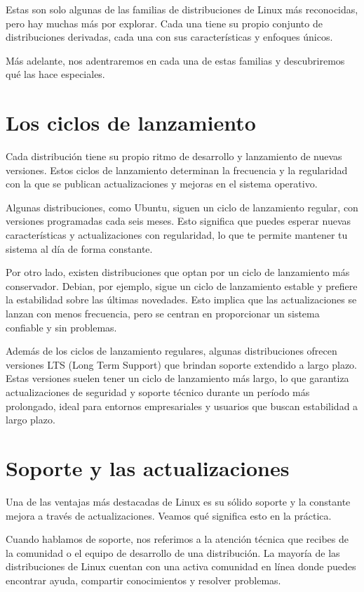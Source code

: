 \documentclass[
  jou,
  floatsintext,
  longtable,
  a4paper,
  nolmodern,
  notxfonts,
  notimes,
  12pt,
  colorlinks=true,linkcolor=blue,citecolor=blue,urlcolor=blue]{apa7}
\begin{document}
Estas son solo algunas de las familias de distribuciones de Linux más
reconocidas, pero hay muchas más por explorar. Cada una tiene su propio
conjunto de distribuciones derivadas, cada una con sus características y
enfoques únicos.

Más adelante, nos adentraremos en cada una de estas familias y
descubriremos qué las hace especiales.

\section{Los ciclos de lanzamiento}\label{los-ciclos-de-lanzamiento}

Cada distribución tiene su propio ritmo de desarrollo y lanzamiento de
nuevas versiones. Estos ciclos de lanzamiento determinan la frecuencia y
la regularidad con la que se publican actualizaciones y mejoras en el
sistema operativo.

Algunas distribuciones, como Ubuntu, siguen un ciclo de lanzamiento
regular, con versiones programadas cada seis meses. Esto significa que
puedes esperar nuevas características y actualizaciones con regularidad,
lo que te permite mantener tu sistema al día de forma constante.

Por otro lado, existen distribuciones que optan por un ciclo de
lanzamiento más conservador. Debian, por ejemplo, sigue un ciclo de
lanzamiento estable y prefiere la estabilidad sobre las últimas
novedades. Esto implica que las actualizaciones se lanzan con menos
frecuencia, pero se centran en proporcionar un sistema confiable y sin
problemas.

Además de los ciclos de lanzamiento regulares, algunas distribuciones
ofrecen versiones LTS (Long Term Support) que brindan soporte extendido
a largo plazo. Estas versiones suelen tener un ciclo de lanzamiento más
largo, lo que garantiza actualizaciones de seguridad y soporte técnico
durante un período más prolongado, ideal para entornos empresariales y
usuarios que buscan estabilidad a largo plazo.

\section{Soporte y las
actualizaciones}\label{soporte-y-las-actualizaciones}

Una de las ventajas más destacadas de Linux es su sólido soporte y la
constante mejora a través de actualizaciones. Veamos qué significa esto
en la práctica.

Cuando hablamos de soporte, nos referimos a la atención técnica que
recibes de la comunidad o el equipo de desarrollo de una distribución.
La mayoría de las distribuciones de Linux cuentan con una activa
comunidad en línea donde puedes encontrar ayuda, compartir conocimientos
y resolver problemas.
\end{document}
